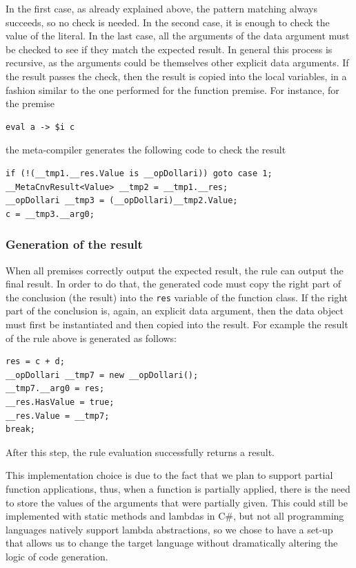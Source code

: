 In the first case, as already explained above, the pattern matching always succeeds, so no check is needed. In the second case, it is enough to check the value of the literal. In the last case, all the arguments of the data argument must be checked to see if they match the expected result. In general this process is recursive, as the arguments could be themselves other explicit data arguments. If the result passes the check, then the result is copied into the local variables, in a fashion similar to the one performed for the function premise. For instance, for the premise

\begin{lstlisting}
eval a -> $i c
\end{lstlisting}

\noindent
the meta-compiler generates the following code to check the result
\begin{lstlisting}
if (!(__tmp1.__res.Value is __opDollari)) goto case 1;
__MetaCnvResult<Value> __tmp2 = __tmp1.__res;
__opDollari __tmp3 = (__opDollari)__tmp2.Value;
c = __tmp3.__arg0;
\end{lstlisting}

\subsubsection{Generation of the result}
When all premises correctly output the expected result, the rule can output the final result. In order to do that, the generated code must copy the right part of the conclusion (the result) into the \texttt{res} variable of the function class. If the right part of the conclusion is, again, an explicit data argument, then the data object must first be instantiated and then copied into the result. For example the result of the rule above is generated as follows:

\begin{lstlisting}
res = c + d;
__opDollari __tmp7 = new __opDollari();
__tmp7.__arg0 = res;
__res.HasValue = true;
__res.Value = __tmp7;
break;
\end{lstlisting}

\noindent
After this step, the rule evaluation successfully returns a result.

This implementation choice is due to the fact that we plan to support partial function applications, thus, when a function is partially applied, there is the need to store the values of the arguments that were partially given. This could still be implemented with static methods and lambdas in C\#, but not all programming languages natively support lambda abstractions, so we chose to have a set-up that allows us to change the target language without dramatically altering the logic of code generation.



